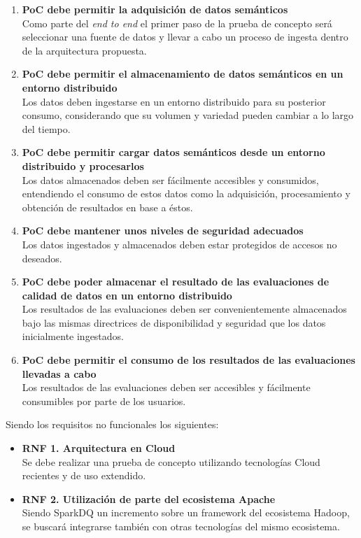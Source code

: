 \begin{enumerate}
\item \textbf{\acs{PoC} debe permitir la adquisición de datos semánticos}\\Como parte
  del \textit{end to end} el primer paso de la prueba de concepto será
  seleccionar una fuente de datos y llevar a cabo un proceso de ingesta dentro
  de la arquitectura propuesta. 
  
\item \textbf{\acs{PoC} debe permitir el almacenamiento de datos semánticos en un
  entorno distribuido}\\Los datos deben ingestarse en un entorno distribuido
  para su posterior consumo, considerando que su volumen y variedad pueden
  cambiar a lo largo del tiempo. 
\item \textbf{\acs{PoC} debe permitir cargar datos semánticos desde un entorno
  distribuido y procesarlos}\\Los datos almacenados deben ser fácilmente
  accesibles y consumidos, entendiendo el consumo de estos datos como la
  adquisición, procesamiento y obtención de resultados en base a éstos. 
\item \textbf{\acs{PoC} debe mantener unos niveles de seguridad adecuados}\\Los datos
  ingestados y almacenados deben estar protegidos de accesos no deseados. 
\item \textbf{\acs{PoC} debe poder almacenar el resultado de las evaluaciones de
  calidad de datos en un entorno distribuido}\\Los resultados de las
  evaluaciones deben ser convenientemente almacenados bajo las mismas
  directrices de disponibilidad y seguridad que los datos inicialmente ingestados.
\item \textbf{\acs{PoC} debe permitir el consumo de los resultados de las evaluaciones
  llevadas a cabo}\\Los resultados de las evaluaciones deben ser accesibles y
  fácilmente consumibles por parte de los usuarios. 
\end{enumerate}

Siendo los requisitos no funcionales los siguientes:

\begin{itemize}
\item \textbf{RNF 1. Arquitectura en Cloud}\\Se debe realizar una prueba de
  concepto utilizando tecnologías Cloud recientes y de uso extendido. 

\item \textbf{RNF 2. Utilización de parte del ecosistema Apache}\\Siendo SparkDQ
  un incremento sobre un framework del ecosistema Hadoop, se buscará integrarse
  también con otras tecnologías del mismo ecosistema. 
\end{itemize}



